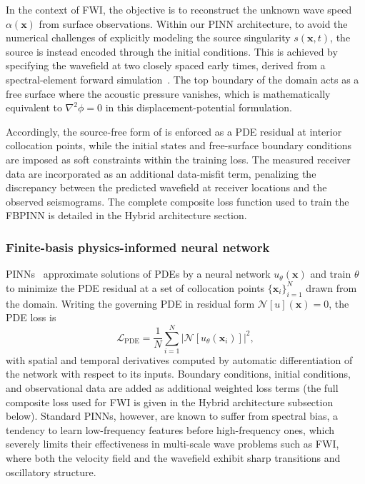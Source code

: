 In the context of FWI, the objective is to reconstruct the unknown wave speed $\alpha(\mathbf{x})$ from surface observations. Within our PINN architecture, to avoid the numerical challenges of explicitly modeling the source singularity $s(\mathbf{x},t)$, the source is instead encoded through the initial conditions. This is achieved by specifying the wavefield at two closely spaced early times, derived from a spectral-element forward simulation~\cite{11367068}. The top boundary of the domain acts as a free surface where the acoustic pressure vanishes, which is mathematically equivalent to $\nabla^2 \phi = 0$ in this displacement-potential formulation.

Accordingly, the source-free form of  is enforced as a PDE residual at interior collocation points, while the initial states and free-surface boundary conditions are imposed as soft constraints within the training loss. The measured receiver data are incorporated as an additional data-misfit term, penalizing the discrepancy between the predicted wavefield at receiver locations and the observed seismograms. The complete composite loss function used to train the FBPINN is detailed in the Hybrid architecture section.

\subsubsection{Finite-basis physics-informed neural network}
\label{sec:ch4-methods-fbpinn}

PINNs~\cite{RAISSI2019686} approximate solutions of PDEs by a neural network $u_\theta(\mathbf{x})$ and train $\theta$ to minimize the PDE residual at a set of collocation points $\{\mathbf{x}_i\}_{i=1}^{N}$ drawn from the domain. Writing the governing PDE in residual form $\mathcal{N}[u](\mathbf{x}) = 0$, the PDE loss is
\begin{equation}
    \mathcal{L}_\text{PDE}
    = \frac{1}{N} \sum_{i=1}^{N}
    \left| \mathcal{N}[u_\theta(\mathbf{x}_i)] \right|^{2},
\end{equation}
with spatial and temporal derivatives computed by automatic differentiation of the network with respect to its inputs. Boundary conditions, initial conditions, and observational data are added as additional weighted loss terms (the full composite loss used for FWI is given in the Hybrid architecture subsection below). Standard PINNs, however, are known to suffer from spectral bias, a tendency to learn low-frequency features before high-frequency ones, which severely limits their effectiveness in multi-scale wave problems such as FWI, where both the velocity field and the wavefield exhibit sharp transitions and oscillatory structure.

